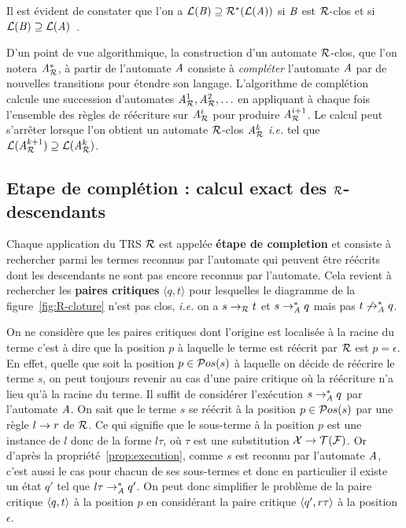 Il est évident de constater que l'on a $\mathcal{L}(\mathit B) \supseteq \mathcal R^*(\mathcal{L}(\mathit A))$
si $\mathit B$ est $\mathcal R$-clos et si $\mathcal{L}(\mathit B)\supseteq \mathcal{L}(\mathit A)$~\cite{BoyerGJ-IJCAR08}.

D'un point de vue algorithmique, la construction d'un automate $\mathcal R$-clos, que l'on notera
${\mathit A}_{\mathcal R}^*$, à partir de l'automate $\mathit A$ consiste à \textit{compléter} l'automate $\mathit A$
par de nouvelles transitions pour étendre son langage. L'algorithme de complétion
calcule une succession d'automates ${\mathit A}_{\mathcal R}^1,{\mathit A}_{\mathcal R}^2,\ldots$ en appliquant à chaque fois
l'ensemble des règles de réécriture sur ${\mathit A}_{\mathcal R}^i$ pour produire ${\mathit A}_{\mathcal R}^{i+1}$.
Le calcul peut s'arrêter lorsque l'on obtient un automate $\mathcal R$-clos 
${\mathit A}_{\mathcal R}^k$ \textit{i.e.} tel que $\mathcal{L}({\mathit A}_{\mathcal R}^{k+1}) \supseteq \mathcal{L}({\mathit A}_{\mathcal R}^k)$.

\subsection{Etape de complétion : calcul exact des $\mathcal R$-descendants}


Chaque application du TRS $\mathcal R$ est appelée \textbf{étape de completion} et 
consiste à rechercher parmi les termes reconnus par l'automate qui peuvent être réécrits
dont les descendants ne sont pas encore reconnus par l'automate.
Cela revient à rechercher les \textbf{paires critiques} $\langle q, t \rangle$ 
pour lesquelles le diagramme de la figure~\ref{fig:R-cloture} n'est pas clos, \textit{i.e.}
on a $s \rightarrow_\mathcal R t$ et $s \rightarrow_{\mathit A}^* q$ mais pas $t \not\rightarrow_{\mathit A}^* q$.

On ne considère que les paires critiques dont l'origine est localisée à la racine du terme c'est à dire
que la position $p$ à laquelle le terme est réécrit par $\mathcal R$ est $p = \epsilon$.
En effet, quelle que soit la position $p \in \mathcal{ P}os(s)$ à laquelle on décide de réécrire le terme
$s$, on peut toujours revenir au cas d'une paire critique où la réécriture n'a lieu qu'à la racine du terme.
Il suffit de considérer l'exécution $s \rightarrow_\mathit A^* q$ par l'automate $\mathit A$. 
On sait que le terme $s$ se réécrit à la position $p \in \mathcal{ P}os(s)$ par une règle $l \rightarrow r$ de $\mathcal R$. Ce qui signifie que le sous-terme à la 
position $p$ est une instance de $l$ donc de la forme $l\tau$, où $\tau$ est une substitution $\mathcal X \rightarrow \mathcal{T(F)}$.
Or d'après la propriété~\ref{prop:execution}, comme $s$ est reconnu par l'automate $\mathit A$, c'est aussi le cas pour chacun de ses sous-termes
et donc en particulier il existe un état $q'$ tel que $l\tau \rightarrow_\mathit A^* q'$. On peut donc simplifier le problème de la paire critique $\langle q, t\rangle$ à la position $p$
en considérant la paire critique $\langle q', r\tau\rangle$ à la position $\epsilon$.


